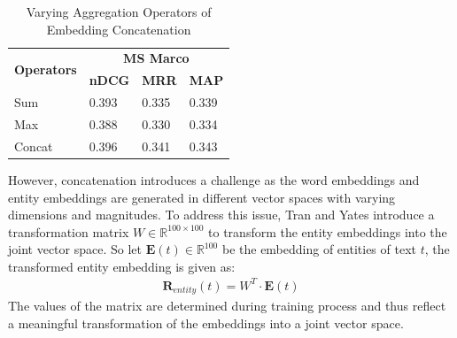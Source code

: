 \begin{table}[!htb]
    \footnotesize
    \centering
    \begin{tabular}{llll}
    \hline
    \multirow{2}{*}{\textbf{Operators}} & \multicolumn{3}{c}{\textbf{MS Marco}}   \\
                                      & \textbf{nDCG} & \textbf{MRR} & \textbf{MAP} \\
    \hline
    Sum & 0.393 & 0.335 & 0.339 \\
    Max & 0.388 & 0.330 & 0.334 \\
    Concat & 0.396 & 0.341 & 0.343 \\
    \hline
    \end{tabular}
    \caption{Varying Aggregation Operators of Embedding Concatenation}
    \label{tab:operator}
\end{table}

However, concatenation introduces a challenge as the word embeddings and entity embeddings are generated in different vector spaces with varying dimensions and magnitudes. To address this issue, Tran and Yates introduce a transformation matrix $W \in \mathbb{R}^{100 \times 100}$ to transform the entity embeddings into the joint vector space. So let $\mathbf{E}(t) \in \mathbb{R}^{100}$ be the embedding of entities of text $t$, the transformed entity embedding is given as:
\begin{align}
    \mathbf{R}_{entity}(t) = W^T \cdot \mathbf{E}(t)
\end{align}
The values of the matrix are determined during training process and thus reflect a meaningful transformation of the embeddings into a joint vector space. 

